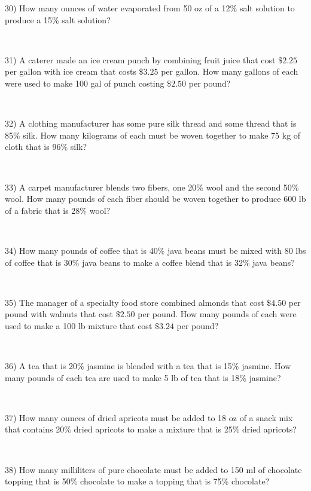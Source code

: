 30) How many ounces of water evaporated from 50 oz of a 12\% salt solution to produce a 15\% salt solution?\par
~\par

31) A caterer made an ice cream punch by combining fruit juice that cost
$\$2.25$ per gallon with ice cream that costs
$\$3.25$ per gallon. How many gallons of each were
used to make 100 gal of punch costing $\$2.50$ per pound?\par
~\par

32) A clothing manufacturer has some pure silk thread and some thread that is 85\% silk. How many kilograms of each must be woven
together to make 75 kg of cloth that is 96\% silk?\par
~\par

33) A carpet manufacturer blends two fibers, one 20\% wool and the second 50\% wool. How many pounds of each fiber should be woven together
to produce 600 lb of a fabric that is 28\% wool?\par
~\par

34) How many pounds of coffee that is 40\% java beans must be mixed with 80 lbs of coffee that is 30\% java beans to make a coffee blend that is
32\% java beans?\par
~\par

35) The manager of a specialty food store combined almonds that cost
$\$4.50$ per pound with walnuts that cost
$\$2.50$ per pound. How many pounds of each were
used to make a 100 lb mixture that cost $\$3.24$ per pound?\par
~\par

36) A tea that is 20\% jasmine is blended with a tea that is 15\% jasmine. How many pounds of each tea are used to make 5 lb of tea
that is 18\% jasmine?\par
~\par

37) How many ounces of dried apricots must be added to 18 oz of a snack mix that contains 20\% dried apricots to make a mixture that
is 25\% dried apricots?\par
~\par

38) How many milliliters of pure chocolate must be added to 150 ml of chocolate topping that is 50\% chocolate to make a topping that is 75\%
chocolate?\par
~\par

